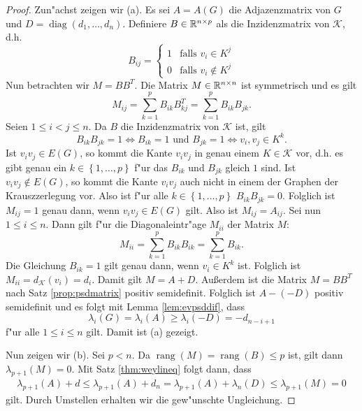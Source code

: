 \begin{proof}
  Zun"achst zeigen wir (a). Es sei $A=A(G)$ die Adjazenzmatrix von $G$ und $D = \operatorname{diag}(d_1,\dots,d_n)$. Definiere $B\in{\mathbb{R}}^{n\times p}$ als die Inzidenzmatrix von $\mathcal K$, d.h. $$B_{ij} = \begin{cases}
    1 & \text{falls } v_i \in K^j \\ 0 & \text{falls }v_i \notin K^j
  \end{cases}$$ 
  Nun betrachten wir $M=BB^{T}$. Die Matrix $M\in {\mathbb{R}^{n\times n}}$ ist symmetrisch und es gilt
  \[
    M_{ij} = \sum\limits_{k=1}^{p}B_{ik}B^{T}_{kj} = \sum\limits_{k=1}^{p}B_{ik}B_{jk}.
  \]
  Seien $1\leq i < j \leq n$. Da $B$ die Inzidenzmatrix von $\mathcal{K}$ ist, gilt  $$ B_{ik} B_{jk} = 1 \Leftrightarrow B_{ik} = 1 \text{ und } B_{jk} = 1 \Leftrightarrow v_i,v_j \in K^{k}.$$ Ist $v_iv_j \in E(G)$, so kommt die Kante $v_iv_j$ in genau einem $K\in \mathcal{K}$ vor, d.h. es gibt genau ein $k\in \left\{ 1,\dots,p \right\}$ f"ur das $B_{ik}$ und $B_{jk}$ gleich $1$ sind. Ist $v_iv_j\notin E(G)$, so kommt die Kante $v_iv_j$ auch nicht in einem der Graphen der Krauszzerlegung vor.
  Also ist f"ur alle $k\in \left\{ 1,\dots, p \right\}$ $B_{ik}B_{jk} = 0$. Folglich ist $M_{ij}=1$ genau dann, wenn $v_iv_j\in E(G)$ gilt. Also ist $M_{ij} = A_{ij}$.
  Sei nun $1\leq i \leq n$. Dann gilt f"ur die Diagonaleintr"age $M_{ii}$ der Matrix $M$:
  \[
    M_{ii} = \sum\limits_{k=1}^{p}B_{ik}B_{ik} = \sum\limits_{k=1}^{p} B_{ik}.
  \]
  Die Gleichung $B_{ik}=1$ gilt genau dann, wenn $v_i \in K^k$ ist. Folglich ist $M_{ii}= d_{\mathcal{K}}(v_i)= d_i$. Damit gilt $M=A+D$. Au{\ss}erdem ist die Matrix $M=BB^{T}$ nach Satz \ref{prop:psdmatrix} positiv semidefinit.
  Folglich ist $A- (-D)$ positiv semidefinit und es folgt mit Lemma \ref{lem:evpsddif}, dass 
  \begin{equation*}
    \lambda_i(G) = \lambda_i(A) \geq \lambda_i(-D) = -d_{n-i+1}
  \end{equation*}
  f"ur alle $1 \leq i \leq n$ gilt. 
  Damit ist (a) gezeigt.

  Nun zeigen wir (b). Sei $p<n$. Da $\operatorname{rang}(M)= \operatorname{rang}(B) \leq p$ ist, gilt dann  $\lambda_{p+1}(M) = 0$. Mit Satz \ref{thm:weylineq} folgt dann, dass
  \begin{align*}
    \lambda_{p+1}(A) + d \leq \lambda_{p+1}(A) + d_{n} = \lambda_{p+1}(A) + \lambda_{n} (D) \leq \lambda_{p+1} (M) = 0
  \end{align*}
  gilt.
  Durch Umstellen erhalten wir die gew"unschte Ungleichung.
\end{proof}

